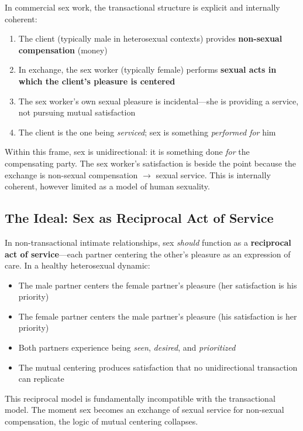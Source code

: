 \documentclass[12pt,openany]{book}
\numberwithin{equation}{chapter}
\begin{document}
In commercial sex work, the transactional structure is explicit and internally coherent:

\begin{enumerate}
    \item The client (typically male in heterosexual contexts) provides \textbf{non-sexual compensation} (money)
    \item In exchange, the sex worker (typically female) performs \textbf{sexual acts in which the client's pleasure is centered}
    \item The sex worker's own sexual pleasure is incidental---she is providing a service, not pursuing mutual satisfaction
    \item The client is the one being \textit{serviced}; sex is something \textit{performed for} him
\end{enumerate}

Within this frame, sex is unidirectional: it is something done \textit{for} the compensating party. The sex worker's satisfaction is beside the point because the exchange is non-sexual compensation $\rightarrow$ sexual service. This is internally coherent, however limited as a model of human sexuality.

\subsection{The Ideal: Sex as Reciprocal Act of Service}

In non-transactional intimate relationships, sex \textit{should} function as a \textbf{reciprocal act of service}---each partner centering the other's pleasure as an expression of care. In a healthy heterosexual dynamic:

\begin{itemize}
    \item The male partner centers the female partner's pleasure (her satisfaction is his priority)
    \item The female partner centers the male partner's pleasure (his satisfaction is her priority)
    \item Both partners experience being \textit{seen}, \textit{desired}, and \textit{prioritized}
    \item The mutual centering produces satisfaction that no unidirectional transaction can replicate
\end{itemize}

This reciprocal model is fundamentally incompatible with the transactional model. The moment sex becomes an exchange of sexual service for non-sexual compensation, the logic of mutual centering collapses.
\end{document}
